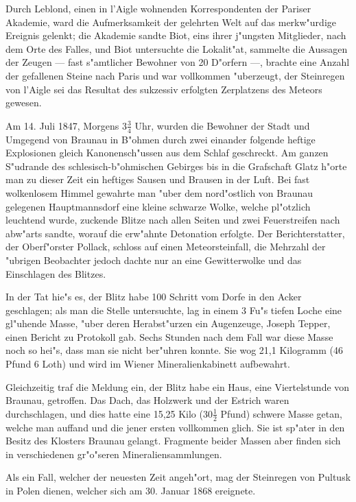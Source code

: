 \documentclass[a4paper, 11pt, oneside]{article}
\begin{document}
Durch Leblond, einen in l'Aigle wohnenden Korrespondenten der Pariser Akademie, ward die Aufmerksamkeit der gelehrten Welt auf das merkw"urdige Ereignis gelenkt; die Akademie sandte Biot, eins ihrer j"ungsten Mitglieder, nach dem Orte des Falles, und Biot untersuchte die Lokalit"at, sammelte die Aussagen der Zeugen --- fast s"amtlicher Bewohner von 20 D"orfern ---, brachte eine Anzahl der gefallenen Steine nach Paris und war vollkommen "uberzeugt, der Steinregen von l'Aigle sei das Resultat des sukzessiv erfolgten Zerplatzens des Meteors gewesen.

Am 14. Juli 1847, Morgens $3\frac{3}{4}$ Uhr, wurden die Bewohner der Stadt und Umgegend von Braunau in B"ohmen durch zwei einander folgende heftige Explosionen gleich Kanonensch"ussen aus dem Schlaf geschreckt. Am ganzen S"udrande des schlesisch-b"ohmischen Gebirges bis in die Grafschaft Glatz h"orte man zu dieser Zeit ein heftiges Sausen und Brausen in der Luft. Bei fast wolkenlosem Himmel gewahrte man "uber dem nord"ostlich von Braunau gelegenen Hauptmannsdorf eine kleine schwarze Wolke, welche pl"otzlich leuchtend wurde, zuckende Blitze nach allen Seiten und zwei Feuerstreifen nach abw"arts sandte, worauf die erw"ahnte Detonation erfolgte. Der Berichterstatter, der Oberf"orster Pollack, schloss auf einen Meteorsteinfall, die Mehrzahl der "ubrigen Beobachter jedoch dachte nur an eine Gewitterwolke und das Einschlagen des Blitzes.

In der Tat hie"s es, der Blitz habe 100 Schritt vom Dorfe in den Acker geschlagen; als man die Stelle untersuchte, lag in einem 3 Fu"s tiefen Loche eine gl"uhende Masse, "uber deren Herabst"urzen ein Augenzeuge, Joseph Tepper, einen Bericht zu Protokoll gab. Sechs Stunden nach dem Fall war diese Masse noch so hei"s, dass man sie nicht ber"uhren konnte. Sie wog 21,1 Kilogramm (46 Pfund 6 Loth) und wird im Wiener Mineralienkabinett aufbewahrt.

Gleichzeitig traf die Meldung ein, der Blitz habe ein Haus, eine Viertelstunde von Braunau, getroffen. Das Dach, das Holzwerk und der Estrich waren durchschlagen, und dies hatte eine 15,25 Kilo ($30\frac{1}{2}$ Pfund) schwere Masse getan, welche man auffand und die jener ersten vollkommen glich. Sie ist sp"ater in den Besitz des Klosters Braunau gelangt. Fragmente beider Massen aber finden sich in verschiedenen gr"o"seren Mineraliensammlungen.

Als ein Fall, welcher der neuesten Zeit angeh"ort, mag der Steinregen von Pultusk in Polen dienen, welcher sich am 30. Januar 1868 ereignete.
\end{document}
